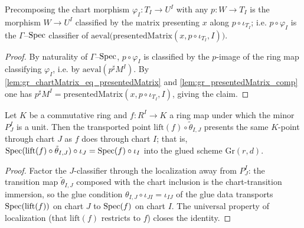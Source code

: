 \begin{lemma}\leanok
  \label{lem:gr_comp_chartMorphism}
  Precomposing the chart morphism \(\varphi_I : T_I \to U^I\) with any \(p : W \to T_I\) is
  the morphism \(W \to U^I\) classified by the matrix presenting \(x\) along
  \(p\circ\iota_{T_I}\); i.e. \(p \circ \varphi_I\) is the \(\Gamma\)--\(\operatorname{Spec}\) classifier of
  \(\mathrm{aeval}\bigl(\mathrm{presentedMatrix}(x, p\circ\iota_{T_I}, I)\bigr)\).
\end{lemma}
\begin{proof}
  By naturality of \(\Gamma\)--\(\operatorname{Spec}\), \(p\circ\varphi_I\) is classified by the \(p\)-image
  of the ring map classifying \(\varphi_I\), i.e. by \(\mathrm{aeval}(p^{\sharp}M^I)\). By
  \cref{lem:gr_chartMatrix_eq_presentedMatrix} and \cref{lem:gr_presentedMatrix_comp} one has
  \(p^{\sharp}M^I = \mathrm{presentedMatrix}(x, p\circ\iota_{T_I}, I)\), giving the claim.
\end{proof}

\begin{lemma}\leanok
  \label{lem:gr_chart_point_eq}
  Let \(K\) be a commutative ring and \(f : R^I \to K\) a ring map under which the minor
  \(P^I_J\) is a unit. Then the transported point
  \(\mathrm{lift}(f)\circ\tilde\theta_{I,J}\) presents the same \(K\)-point through chart
  \(J\) as \(f\) does through chart \(I\); that is,
  \(\operatorname{Spec}(\mathrm{lift}(f)\circ\tilde\theta_{I,J})\circ\iota_J = \operatorname{Spec}(f)\circ\iota_I\) into
  the glued scheme \(\mathrm{Gr}(r,d)\).
\end{lemma}
\begin{proof}

  Factor the \(J\)-classifier through the localization away from \(P^I_J\): the transition map
  \(\tilde\theta_{I,J}\) composed with the chart inclusion is the chart-transition immersion,
  so the glue condition \(\theta_{I,J}\circ\iota_{JI} = \iota_{IJ}\) of the glue data
  transports \(\operatorname{Spec}(\mathrm{lift}(f))\) on chart \(J\) to \(\operatorname{Spec}(f)\) on chart \(I\). The
  universal property of localization (that \(\mathrm{lift}(f)\) restricts to \(f\)) closes the
  identity.
\end{proof}

